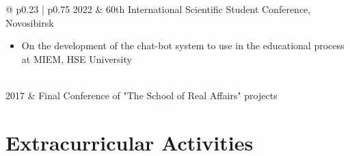 \documentclass[12pt, a4paper]{extarticle}
\begin{document}
\begin{tabular}{ @{\hskip 0pt} p{0.23\textwidth} | p{0.75\textwidth} }
    2022 & 60th International Scientific Student Conference, Novosibirsk \newline 
    \begin{minipage}[t]{\linewidth}
        \begin{itemize}[nosep,after=\strut]
            \item On the development of the chat-bot system to use in the educational process at MIEM, HSE University
        \end{itemize}
    \end{minipage} \\
    2017 & Final Conference of "The School of Real Affairs" projects  \\
\end{tabular}

\section*{Extracurricular Activities}
\end{document}
